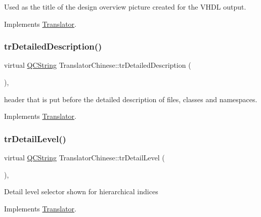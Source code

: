 Used as the title of the design overview picture created for the V\+H\+DL output. 

Implements \mbox{\hyperlink{class_translator}{Translator}}.

\mbox{\label{class_translator_chinese_a3c57752f0aae9b5b39c2e511d985c220}} 
\subsubsection{\texorpdfstring{trDetailedDescription()}{trDetailedDescription()}}
{\footnotesize\ttfamily virtual \mbox{\hyperlink{class_q_c_string}{Q\+C\+String}} Translator\+Chinese\+::tr\+Detailed\+Description (\begin{DoxyParamCaption}{ }\end{DoxyParamCaption})\hspace{0.3cm}{\ttfamily [inline]}, {\ttfamily [virtual]}}

header that is put before the detailed description of files, classes and namespaces. 

Implements \mbox{\hyperlink{class_translator}{Translator}}.

\mbox{\label{class_translator_chinese_a03397b2ca00484884f7fb9be9d666d03}} 
\subsubsection{\texorpdfstring{trDetailLevel()}{trDetailLevel()}}
{\footnotesize\ttfamily virtual \mbox{\hyperlink{class_q_c_string}{Q\+C\+String}} Translator\+Chinese\+::tr\+Detail\+Level (\begin{DoxyParamCaption}{ }\end{DoxyParamCaption})\hspace{0.3cm}{\ttfamily [inline]}, {\ttfamily [virtual]}}

Detail level selector shown for hierarchical indices 

Implements \mbox{\hyperlink{class_translator}{Translator}}.

\mbox{\label{class_translator_chinese_ac39bd93fa1e18ef1949bd9dc43c0257a}} 
